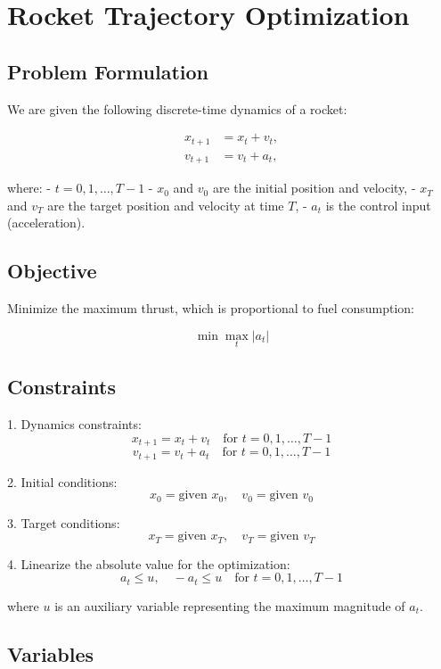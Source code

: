 \documentclass{article}
\begin{document}
\section*{Rocket Trajectory Optimization}

\subsection*{Problem Formulation}

We are given the following discrete-time dynamics of a rocket:

\begin{align*}
    x_{t+1} &= x_t + v_t, \\
    v_{t+1} &= v_t + a_t,
\end{align*}

where:
- \( t = 0, 1, \ldots, T-1 \)
- \( x_0 \) and \( v_0 \) are the initial position and velocity,
- \( x_T \) and \( v_T \) are the target position and velocity at time \( T \),
- \( a_t \) is the control input (acceleration).

\subsection*{Objective}

Minimize the maximum thrust, which is proportional to fuel consumption:

\[
\min \max_{t} |a_t|
\]

\subsection*{Constraints}

1. Dynamics constraints:
    \[
    x_{t+1} = x_t + v_t \quad \text{for } t = 0, 1, \ldots, T-1
    \]
    \[
    v_{t+1} = v_t + a_t \quad \text{for } t = 0, 1, \ldots, T-1
    \]

2. Initial conditions:
    \[
    x_0 = \text{given } x_0, \quad v_0 = \text{given } v_0
    \]

3. Target conditions:
    \[
    x_T = \text{given } x_T, \quad v_T = \text{given } v_T
    \]

4. Linearize the absolute value for the optimization:
    \[
    a_t \leq u, \quad -a_t \leq u \quad \text{for } t = 0, 1, \ldots, T-1
    \]

where \( u \) is an auxiliary variable representing the maximum magnitude of \( a_t \).

\subsection*{Variables}
\end{document}
